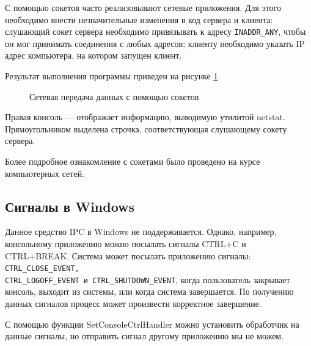 \documentclass[a4paper]{article}
\begin{document}
	С помощью сокетов часто реализовывают сетевые приложения. Для этого необходимо внести незначительные изменения в код сервера и клиента: слушающий сокет сервера необходимо привязывать к адресу \texttt{INADDR\_ANY}, чтобы он мог принимать соединения с любых адресов; клиенту необходимо указать IP адрес компьютера, на котором запущен клиент.
	
	Результат выполнения программы приведен на рисунке \ref{img:task6_3}.
	\begin{figure}[h!]
		\caption{Сетевая передача данных с помощью сокетов}
		\label{img:task6_3}
	\end{figure}
	
	Правая консоль --– отображает информацию, выводимую утилитой netstat. Прямоугольником выделена строчка, соответствующая слушающему сокету сервера.
	
	Более подробное ознакомление с сокетами было проведено на курсе компьютерных сетей.
	
\subsection{Сигналы в Windows}
	Данное средство IPC в Windows не поддерживается. Однако, например, консольному приложению можно посылать сигналы CTRL+C и CTRL+BREAK. Система может посылать приложению сигналы: \texttt{CTRL\_CLOSE\_EVENT,\\ CTRL\_LOGOFF\_EVENT и CTRL\_SHUTDOWN\_EVENT}, когда пользователь закрывает консоль, выходит из системы, или когда система завершается. По получению данных сигналов процесс может произвести корректное завершение.
	
	С помощью функции SetConsoleCtrlHandler можно установить обработчик на данные сигналы, но отправить сигнал другому приложению мы не можем. 
	
\end{document}
